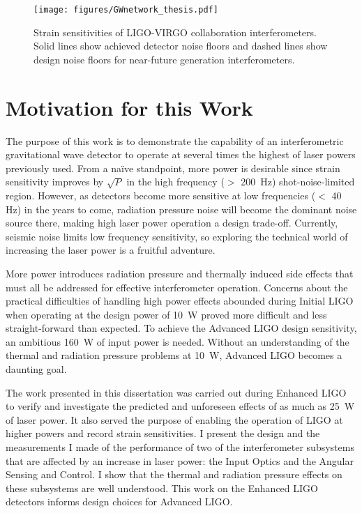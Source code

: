 \begin{figure}
\begin{centering}
\texttt{[image: figures/GWnetwork\_thesis.pdf]}
\caption[Strain sensitivities of LIGO-VIRGO collaboration
interferometers]{Strain sensitivities of LIGO-VIRGO collaboration
  interferometers. Solid lines show achieved detector noise floors and
  dashed lines show design noise floors for near-future generation
  interferometers.}
\label{fig:h_all}
\end{centering}
\end{figure}


\section{Motivation for this Work}
The purpose of this work is to demonstrate the capability of an
interferometric gravitational wave detector to operate at several
times the highest of laser powers previously used. From a na\"ive
standpoint, more power is desirable since strain sensitivity improves
by $\sqrt{P}$ in the high frequency ($>$ 200~Hz) shot-noise-limited
region. However, as detectors become more sensitive at low frequencies
($<$ 40 Hz) in the years to come, radiation pressure noise will become
the dominant noise source there, making high laser power operation a
design trade-off. Currently, seismic noise limits low frequency
sensitivity, so exploring the technical world of increasing the laser
power is a fruitful adventure.

More power introduces radiation pressure and thermally induced side
effects that must all be addressed for effective interferometer
operation. Concerns about the practical difficulties of handling high
power effects abounded during Initial LIGO when operating at the
design power of 10~W proved more difficult and less straight-forward
than expected. To achieve the Advanced LIGO design sensitivity, an
ambitious 160~W of input power is needed. Without an understanding of
the thermal and radiation pressure problems at 10~W, Advanced LIGO
becomes a daunting goal.

The work presented in this dissertation was carried out during
Enhanced LIGO to verify and investigate the predicted and unforeseen
effects of as much as 25~W of laser power. It also served the purpose
of enabling the operation of LIGO at higher powers and record strain
sensitivities. I present the design and the measurements I made of the
performance of two of the interferometer subsystems that are affected
by an increase in laser power: the Input Optics and the Angular
Sensing and Control. I show that the thermal and radiation pressure
effects on these subsystems are well understood. This work on the
Enhanced LIGO detectors informs design choices for Advanced LIGO.

